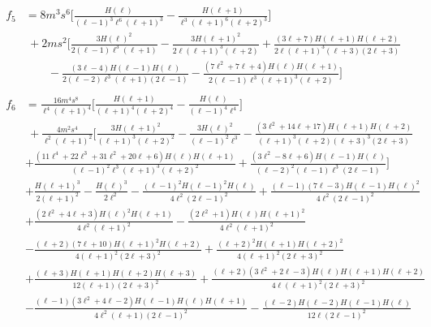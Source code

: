 \begin{subequations}[resume]
\begin{align}
    \begin{split}
        f_5 &= 8 m^3 s^6 \bigg[ \frac{H(\ell)}{(\ell-1)^3 \ell^6 (\ell+1)^3} 
        - \frac{H(\ell+1)}{\ell^3 (\ell+1)^6 (\ell+2)^3} \bigg] \\ 
        &~ + 2 m s^2 \bigg[ \frac{3 H(\ell)^2}{2 (\ell-1) \ell^3 (\ell+1)}
        - \frac{3 H(\ell+1)^2}{2 \ell (\ell+1)^3 (\ell+2)} 
        + \frac{(3 \ell+7) H(\ell+1) H(\ell+2)}{2 \ell (\ell+1)^3 (\ell+3) (2 \ell+3)} \\
        &\qquad - \frac{(3 \ell-4) H(\ell-1) H(\ell)}{ 2(\ell-2) \ell^3 (\ell+1) (2 \ell-1)} 
        - \frac{(7 \ell^2 + 7\ell + 4 ) H(\ell) H(\ell+1)}{2(\ell-1) \ell^3 (\ell+1)^3 (\ell+2)} \bigg]
    \end{split} \\[0.15cm]
    \begin{split}
        f_6 &= \frac{16 m^4 s^8}{\ell^4 (\ell+1)^4} \bigg[ 
        \frac{H(\ell+1)}{(\ell+1)^4 (\ell+2)^4} 
        - \frac{H(\ell)}{(\ell-1)^4 \ell^4} \bigg] \\
        &~ + \frac{4 m^2 s^4}{\ell^2 (\ell+1)^2} \bigg[ 
        \frac{3 H(\ell+1)^2}{(\ell+1)^3 (\ell+2)^2}
        - \frac{3 H(\ell)^2}{(\ell-1)^2 \ell^3}
        - \frac{(3\ell^2+14\ell+17)H(\ell+1)H(\ell+2)}{(\ell+1)^3(\ell+2)(\ell+3)^3(2\ell+3)} \\
        & +\frac{(11\ell^4+22\ell^3+31\ell^2+20\ell+6) H(\ell)H(\ell+1)}{(\ell-1)^2 \ell^3 (\ell+1)^3 (\ell+2)^2}
        + \frac{(3\ell^2 -8\ell +6) H(\ell-1) H(\ell)}{(\ell-2)^2 (\ell-1) \ell^3 (2\ell-1)} \bigg] \\
        & + \frac{H(\ell+1)^3}{2(\ell+1)^2}
        - \frac{H(\ell)^3}{2 \ell^2} 
        -\frac{(\ell-1)^2 H(\ell-1)^2 H(\ell)}{4 \ell^2 (2 \ell-1)^2}
        +\frac{(\ell-1) (7 \ell-3) H(\ell-1) H(\ell)^2}{4 \ell^2 (2 \ell-1)^2} \\
        & +\frac{ (2 \ell^2+4 \ell+3 ) H(\ell)^2 H(\ell+1)}{4 \ell^2 (\ell+1)^2}
        -\frac{ (2 \ell^2+1 ) H(\ell) H(\ell+1)^2}{4 \ell^2 (\ell+1)^2} \\
        & -\frac{(\ell+2) (7 \ell+10) H(\ell+1)^2 H(\ell+2)}{4 (\ell+1)^2 (2 \ell+3)^2}
        +\frac{(\ell+2)^2 H(\ell+1) H(\ell+2)^2}{4 (\ell+1)^2 (2 \ell+3)^2} \\
        & +\frac{(\ell+3) H(\ell+1) H(\ell+2) H(\ell+3)}{12 (\ell+1) (2 \ell+3)^2}  
        +\frac{(\ell+2)(3 \ell^2+2 \ell-3 ) H(\ell) H(\ell+1) H(\ell+2)}{4 \ell (\ell+1)^2 (2 \ell+3)^2} \\
        & -\frac{(\ell-1)(3 \ell^2+4 \ell-2 ) H(\ell-1) H(\ell) H(\ell+1)}{4 \ell^2 (\ell+1) (2 \ell-1)^2} 
        -\frac{(\ell-2) H(\ell-2) H(\ell-1) H(\ell)}{12 \ell (2 \ell-1)^2}
    \end{split}
\end{align}
\end{subequations}
